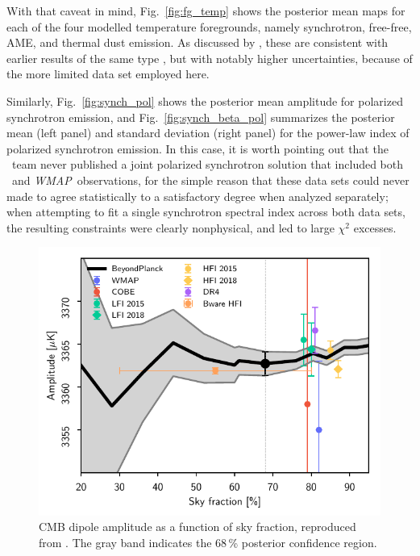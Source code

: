 \documentclass[twocolumn]{aa}
\def\WMAP{\emph{WMAP}}
\begin{document}
With that caveat in mind, Fig.~\ref{fig:fg_temp} shows the posterior
mean maps for each of the four modelled temperature foregrounds,
namely synchrotron, free-free, AME, and thermal dust emission. As
discussed by \citet{bp13}, these are consistent with earlier results
of the same type \citep{planck2014-a12}, but with notably higher
uncertainties, because of the more limited data set employed here.

Similarly, Fig.~\ref{fig:synch_pol} shows the posterior mean amplitude
for polarized synchrotron emission, and Fig.~\ref{fig:synch_beta_pol}
summarizes the posterior mean (left panel) and standard deviation
(right panel) for the power-law index of polarized synchrotron
emission. In this case, it is worth pointing out that the
\Planck\ team never published a joint polarized synchrotron solution
that included both \Planck\ and \WMAP\ observations, for the simple
reason that these data sets could never made to agree statistically to
a satisfactory degree when analyzed separately; when attempting to fit
a single synchrotron spectral index across both data sets, the
resulting constraints were clearly nonphysical, and led to large
$\chi^2$ excesses.

\begin{figure}[t]
  \center
  \includegraphics[width=\linewidth]{figs/cmb_dipole_amplitude.pdf}
  \caption{CMB dipole amplitude as a function of sky fraction, reproduced from \citet{bp11}.
    The gray band indicates the 68\,\% posterior confidence region.}\label{fig:cmb_dipole}
\end{figure}
\end{document}
